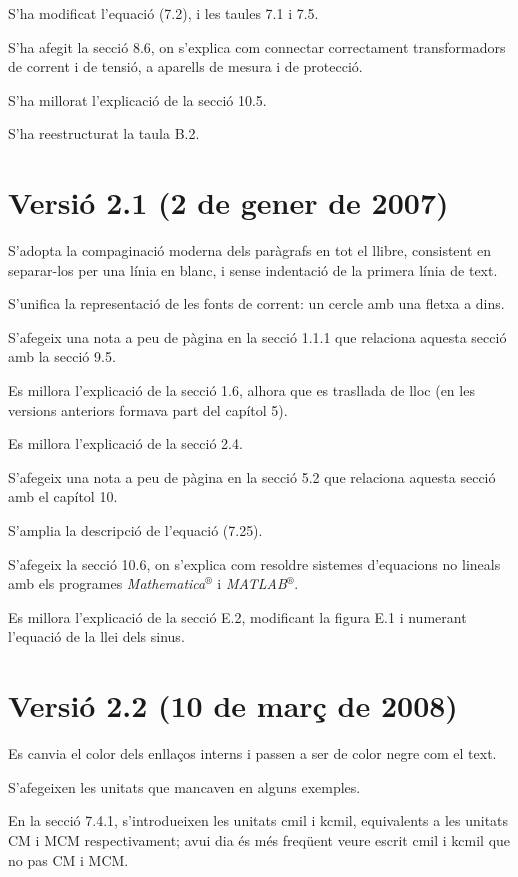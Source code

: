  S'ha modificat l'equació (7.2),
i les taules 7.1 i 7.5.

S'ha afegit la secció 8.6, on s'explica com
connectar correctament transformadors de corrent i de tensió, a
aparells de mesura i de protecció.

S'ha millorat l'explicació de la secció 10.5.

S'ha reestructurat la taula B.2.

\section*{Versió 2.1 (2 de gener de 2007)}

S'adopta la compaginació moderna dels paràgrafs en tot el llibre, consistent en separar-los per una línia en blanc, i sense indentació de la primera línia de text.

S'unifica la representació de les fonts de corrent: un cercle amb una fletxa a dins.

S'afegeix una nota a peu de pàgina en la secció 1.1.1 que relaciona aquesta secció amb la secció 9.5.

Es millora l'explicació de la secció 1.6, alhora que es trasllada de lloc (en les versions anteriors formava part del capítol 5).

Es millora l'explicació de la secció 2.4.

S'afegeix una nota a peu de pàgina en la secció 5.2 que relaciona aquesta secció amb el capítol 10.

S'amplia la descripció de l'equació (7.25).

S'afegeix la secció 10.6, on s'explica com resoldre sistemes d'equacions no lineals amb els programes \textit{Mathematica}${}^\circledR$ i \textit{MATLAB}${}^\circledR$.

Es millora l'explicació de la secció E.2, modificant la figura E.1 i numerant l'equació de la llei dels sinus.

\section*{Versió 2.2 (10 de març de 2008)}

Es canvia el color dels enllaços interns i passen a ser de color negre com el text.

S'afegeixen les unitats que mancaven en alguns exemples.

En la secció 7.4.1, s'introdueixen les unitats cmil i kcmil, equivalents a les unitats CM i MCM respectivament; avui dia és més freqüent veure escrit cmil i kcmil que no pas CM i MCM.

